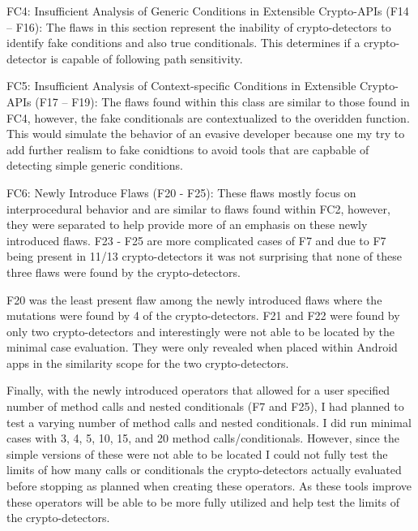 FC4: Insufficient Analysis of Generic Conditions in Extensible Crypto-APIs (F14 – F16): The flaws in this section represent the inability of crypto-detectors to identify fake conditions and also true conditionals. This determines if a crypto-detector is capable of following path sensitivity.

FC5: Insufficient Analysis of Context-specific Conditions in Extensible Crypto-APIs (F17 – F19): The flaws found within this class are similar to those found in FC4, however, the fake conditionals are contextualized to the overidden function. This would simulate the behavior of an evasive developer because one my try to add further realism to fake conidtions to avoid tools that are capbable of detecting simple generic conditions.

FC6: Newly Introduce Flaws (F20 - F25): These flaws mostly focus on interprocedural behavior and are similar to flaws found within FC2, however, they were separated to help provide more of an emphasis on these newly introduced flaws. F23 - F25 are more complicated cases of F7 and due to F7 being present in 11/13 crypto-detectors it was not surprising that none of these three flaws were found by the crypto-detectors.

F20 was the least present flaw among the newly introduced flaws where the mutations were found by 4 of the crypto-detectors. F21 and F22 were found by only two crypto-detectors and interestingly were not able to be located by the minimal case evaluation. They were only revealed when placed within Android apps in the similarity scope for the two crypto-detectors.

Finally, with the newly introduced operators that allowed for a user specified number of method calls and nested conditionals (F7 and F25), I had planned to test a varying number of method calls and nested conditionals. I did run minimal cases with 3, 4, 5, 10, 15, and 20 method calls/conditionals. However, since the simple versions of these were not able to be located I could not fully test the limits of how many calls or conditionals the crypto-detectors actually evaluated before stopping as planned when creating these operators. As these tools improve these operators will be able to be more fully utilized and help test the limits of the crypto-detectors.







